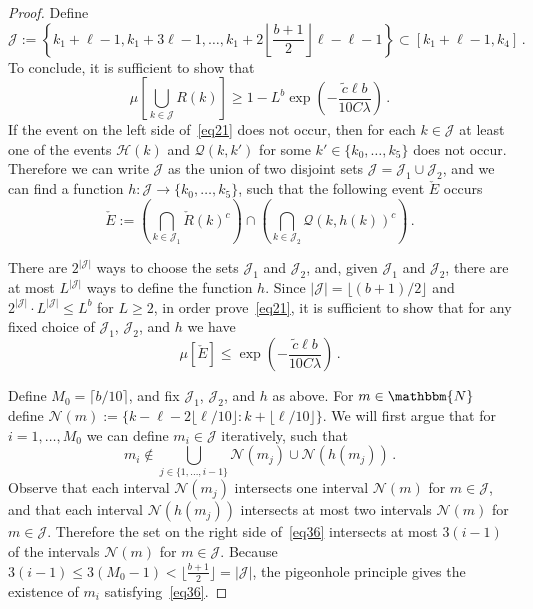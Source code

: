 \documentclass[final,12pt]{colt2018} %
\newcommand{\N}{\mathbbm{N}}
\newcommand{\1}{\mathbf{1}}
\def\cN{\mathcal{N}}
\def\cJ{\mathcal{J}}
\newcommand{\eqb}{\begin{equation}}
\newcommand{\eqe}{\end{equation}}
\newcommand{\wt}{\widetilde}
\def\ct{{\wt c}}
\def\Rhat{{\mathcal Q}}
\def\Rc{{\mathcal H}}
\begin{document}
\begin{proof}
	Define
	$$\cJ := \left \{ k_1 + \ell - 1 , k_1 + 3 \ell - 1 , \dots, k_1 +
	2 \left \lfloor \frac{b+1}{2} \right \rfloor \ell - \ell - 1 \right \}
	\subset [k_1 + \ell - 1 , k_4] \, .$$
	To conclude, it is sufficient to show that
	\eqb \label{eq21}
	\mu \left [ \bigcup_{k \in \cJ} R(k) \right ] \geq
	1 - L^b \exp \left ( -\frac{\ct \ell b}{10 C \lambda} \right ) \, .
	\eqe
	If the event on the left side of~\eqref{eq21} does not occur,
	then for each $k \in \cJ$ at least one of the events $\Rc (k)$
	and $\Rhat (k,k')$ for some $k'\in\{ k_0,\dots,k_5 \}$ does not occur.
	Therefore we can write $\cJ$ as the union of two disjoint sets
	$\cJ = \cJ_1 \cup \cJ_2$, and we can find a function
	$h : \cJ \to \{ k_0,\dots,k_5 \}$, such that the following event
	$\check E$ occurs
	\eqb \label{eq27}
	\check E:= \left(\bigcap_{k \in \cJ_1} \check R(k)^c \right )
	\cap \left(\bigcap_{k \in \cJ_2} \Rhat (k,h(k))^c \right ) \, .
	\eqe
	
	There are $2^{|\cJ|}$ ways to choose the sets $\cJ_1$ and $\cJ_2$,
	and, given $\cJ_1$ and $\cJ_2$, there are at most $L^{|\cJ|}$ ways
	to define the function $h$.  Since $|\cJ| = \lfloor (b+1)/2 \rfloor$
	and $2^{|\cJ|} \cdot L^{|\cJ|} \leq L^b$ for $L\geq 2$, in order prove~\eqref{eq21},
	it is sufficient to show that for any fixed choice of $\cJ_1$, $\cJ_2$,
	and $h$ we have
	\eqb \label{eq20}
	\mu\left [ \check E \right ] \leq
	\exp \left ( -\frac{\ct \ell b}{10 C \lambda} \right ) \, .
	\eqe
	
	Define $M_0 = \lceil b/10 \rceil$, and fix $\cJ_1$, $\cJ_2$, and $h$
	as above.  For $m \in \N$ define $\cN(m) :=
	\{k - \ell - 2 \lfloor \ell/10 \rfloor : k + \lfloor \ell/10 \rfloor\}$.
	We will first argue that for $i=1 , \dots , M_0$ we can define
	$m_i \in \cJ$ iteratively, such that
	\eqb \label{eq36}
	m_i \not \in \bigcup_{j \in \{1, \dots , i-1 \}}
	\cN(m_j) \cup \cN (h(m_j)) \, .
	\eqe
	Observe that each interval $\cN(m_j)$ intersects one interval
	$\cN(m)$ for $m \in \cJ$, and that each interval $\cN (h(m_j))$
	intersects at most two intervals $\cN(m)$ for $m \in \cJ$.
	Therefore the set on the right side of~\eqref{eq36} intersects
	at most $3(i-1)$ of the intervals $\cN(m)$ for $m \in \cJ$.
	Because $3(i-1) \leq 3(M_0-1) < \lfloor \frac{b+1}{2} \rfloor = |\cJ|$,
	the pigeonhole principle gives the existence of $m_i$ satisfying~\eqref{eq36}.
	

\end{proof}
\end{document}
